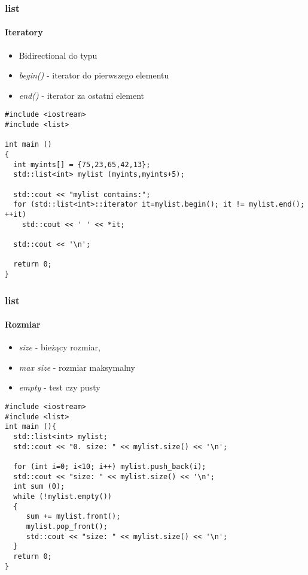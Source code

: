 \documentclass[10pt]{beamer}
\begin{document}
\begin{frame}[fragile]
  \frametitle{list}
  \framesubtitle{Iteratory}
  \begin{itemize}
    \item Bidirectional do typu
    \item \textit{begin()} - iterator do pierwszego elementu
    \item \textit{end()} - iterator za ostatni element
  \end{itemize}
  \begin{lstlisting}
#include <iostream>
#include <list>

int main ()
{
  int myints[] = {75,23,65,42,13};
  std::list<int> mylist (myints,myints+5);

  std::cout << "mylist contains:";
  for (std::list<int>::iterator it=mylist.begin(); it != mylist.end(); ++it)
    std::cout << ' ' << *it;

  std::cout << '\n';

  return 0;
}
\end{lstlisting}
\end{frame}

\begin{frame}[fragile]
  \frametitle{list}
  \framesubtitle{Rozmiar}
  \begin{itemize} 
    \item \textit{size} - bieżący rozmiar,
    \item \textit{max size} - rozmiar maksymalny
    \item \textit{empty} - test czy pusty
  \end{itemize}
  \begin{lstlisting}
#include <iostream>
#include <list>
int main (){
  std::list<int> mylist;
  std::cout << "0. size: " << mylist.size() << '\n';

  for (int i=0; i<10; i++) mylist.push_back(i);
  std::cout << "size: " << mylist.size() << '\n';
  int sum (0);
  while (!mylist.empty())
  {
     sum += mylist.front();
     mylist.pop_front();
     std::cout << "size: " << mylist.size() << '\n';
  }
  return 0;
}
\end{lstlisting}
\end{frame}
\end{document}
